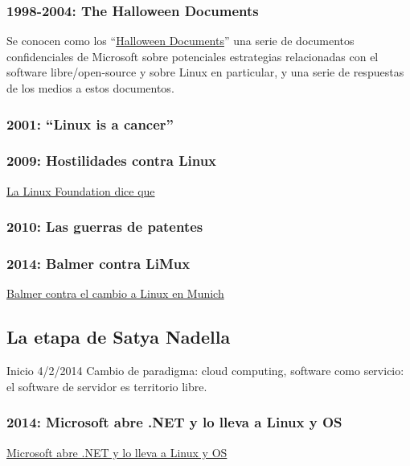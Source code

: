 \documentclass[10pt, titlepage]{article}
\begin{document}
\subsubsection{1998-2004: The Halloween Documents}
Se conocen como los ``\href{https://en.wikipedia.org/wiki/Halloween_documents}{Halloween Documents}'' una serie de documentos confidenciales de Microsoft sobre potenciales estrategias relacionadas con el software libre/open-source y sobre Linux en particular, y una serie de respuestas de los medios a estos documentos.

\subsubsection{2001: ``Linux is a cancer''}

\subsubsection{2009: Hostilidades contra Linux}
\href {https://arstechnica.com/information-technology/2009/04/linux-foundation-says-its-time-to-ditch-microsofts-fat/}{La Linux Foundation dice que  }

\subsubsection{2010: Las guerras de patentes}

\subsubsection{2014: Balmer contra LiMux}
 \href{https://www.muycomputer.com/2014/05/16/linux-en-munich/}{Balmer contra el cambio a Linux en Munich}

\subsection{La etapa de Satya Nadella}
Inicio 4/2/2014
Cambio de paradigma: cloud computing, software como servicio: el software de servidor es territorio libre.

\subsubsection{2014: Microsoft abre .NET y lo lleva a Linux y OS}
\href{https://arstechnica.com/information-technology/2014/11/microsoft-open-sources-net-takes-it-to-linux-and-os-x/}{Microsoft abre .NET y lo lleva a Linux y OS}
\end{document}
